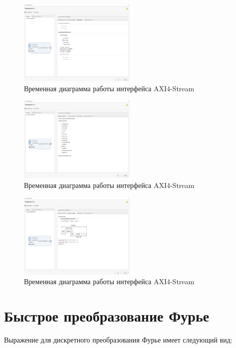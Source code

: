 \begin{figure}[h]
	\centering
	\includegraphics[width=0.5\textwidth]{image/fp_optimizations.png}
	\caption{Временная диаграмма работы интерфейса AXI4-Stream}
	\label{fp_optimizations}
\end{figure}

\begin{figure}[h]
	\centering
	\includegraphics[width=0.5\textwidth]{image/fp_selection_tab.png}
	\caption{Временная диаграмма работы интерфейса AXI4-Stream}
	\label{fp_selection_tab}
\end{figure}

\begin{figure}[h]
	\centering
	\includegraphics[width=0.5\textwidth]{image/fp_precision_type.png}
	\caption{Временная диаграмма работы интерфейса AXI4-Stream}
	\label{fp_precision_type}
\end{figure}

\section{Быстрое преобразование Фурье}
	Выражение для дискретного преобразования Фурье имеет следующий вид:

